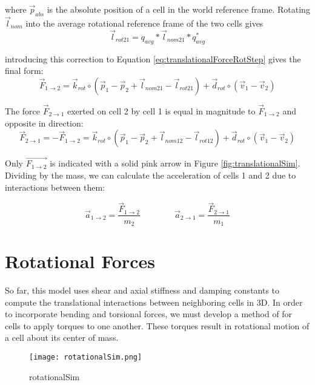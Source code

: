 { where $\vec{p}_{abs}$ is the absolute position of a cell in the world reference frame.
 Rotating $\vec{l}_{nom}$ into the average rotational reference frame of the two cells gives
 \[\vec{l}_{rot21} = q_{avg}*\vec{l}_{nom21}*q_{avg}^*\]
 
introducing this correction to Equation \ref{eq:translationalForceRotStep} gives the final form:
 \begin{equation} \label{eq:translationalForceRot}
  \vec{F}_{1\rightarrow2} = \vec{k}_{rot} \circ (\vec{p}_1 - \vec{p}_2 + \vec{l}_{nom21}-\vec{l}_{rot21}) + \vec{d}_{rot} \circ (\vec{v}_1 - \vec{v}_2)
  \end{equation}

The force $\vec{F}_{2\rightarrow1}$ exerted on cell 2 by cell 1 is equal in magnitude to $\vec{F}_{1\rightarrow2}$ and opposite in direction:
 \begin{equation} \label{eq:translationalEqOpp}
  \vec{F}_{2\rightarrow1} = -\vec{F}_{1\rightarrow2} = \vec{k}_{rot} \circ (\vec{p}_1 - \vec{p}_2 + \vec{l}_{nom12}-\vec{l}_{rot12}) + \vec{d}_{rot} \circ (\vec{v}_1 - \vec{v}_2)
  \end{equation}

Only $\vec{F_{1\rightarrow2}}$ is indicated with a solid pink arrow in Figure \ref{fig:translationalSim}.\\

Dividing by the mass, we can calculate the acceleration of cells 1 and 2 due to interactions between them:

 \[ \vec{a}_{1\rightarrow2} = \dfrac{\vec{F}_{1\rightarrow2}}{m_2} 
  \qquad\qquad
   \vec{a}_{2\rightarrow1} = \dfrac{\vec{F}_{2\rightarrow1}}{m_1} 
  \]

\section{Rotational Forces}

So far, this model uses shear and axial stiffness and damping constants to compute the translational interactions between neighboring cells in 3D.  In order to incorporate bending and torsional forces, we must develop a method of for cells to apply torques to one another.  These torques result in rotational motion of a cell about its center of mass.\\

\begin{figure}
  \texttt{[image: rotationalSim.png]}
  \caption{rotationalSim}
  \label{fig:rotationalSim}
\end{figure}

}
